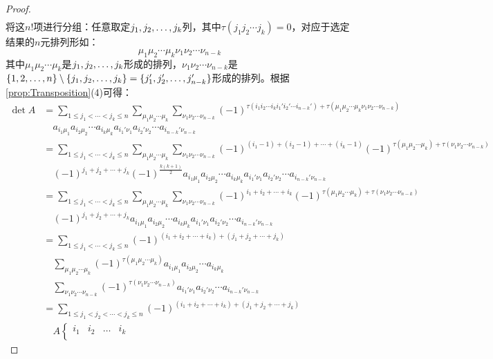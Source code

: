 \begin{proof}
\begin{align*}
	\end{align*}
	将这$n!$项进行分组：任意取定$j_1, j_2, \dots, j_{k}$列，其中$\tau(j_1j_2\cdots j_k)=0$，对应于选定结果的$n$元排列形如：
	\begin{equation*}
		\mu_1\mu_2\cdots\mu_k\nu_1\nu_2\cdots\nu_{n-k}
	\end{equation*}
	其中$\mu_1\mu_2\cdots\mu_k$是$j_1, j_2, \dots, j_{k}$形成的排列，$\nu_1\nu_2\cdots\nu_{n-k}$是$\{1,2,\dots,n\}\setminus\{j_1, j_2, \dots, j_{k}\}=\{j_1',j_2',\dots,j_{n-k}'\}$形成的排列。根据\cref{prop:Transposition}(4)可得：
	\begin{align*}
		\det A&=\sum_{1\leqslant j_1<\cdots<j_k\leqslant n}\sum_{\mu_1\mu_2\cdots\mu_k}\sum_{\nu_1\nu_2\cdots\nu_{n-k}}(-1)^{\tau(i_1i_2\cdots i_ki_1'i_2'\cdots i_{n-k}')+\tau(\mu_1\mu_2\cdots\mu_k\nu_1\nu_2\cdots\nu_{n-k})} \\
		&\quad a_{i_1\mu_1}a_{i_2\mu_2}\cdots a_{i_k\mu_k}a_{i_1'\nu_1}a_{i_2'\nu_2}\cdots a_{i_{n-k}'\nu_{n-k}} \\
		&=\sum_{1\leqslant j_1<\cdots<j_k\leqslant n}\sum_{\mu_1\mu_2\cdots\mu_k}\sum_{\nu_1\nu_2\cdots\nu_{n-k}}(-1)^{(i_1-1)+(i_2-1)+\cdots+(i_{k}-1)}(-1)^{\tau(\mu_1\mu_2\cdots\mu_k)+\tau(\nu_1\nu_2\cdots\nu_{n-k})} \\
		&\quad(-1)^{j_1+j_2+\cdots+j_k}(-1)^{\frac{k(k+1)}{2}}a_{i_1\mu_1}a_{i_2\mu_2}\cdots a_{i_k\mu_k}a_{i_1'\nu_1}a_{i_2'\nu_2}\cdots a_{i_{n-k}'\nu_{n-k}} \\
		&=\sum_{1\leqslant j_1<\cdots<j_k\leqslant n}\sum_{\mu_1\mu_2\cdots\mu_k}\sum_{\nu_1\nu_2\cdots\nu_{n-k}}(-1)^{i_1+i_2+\cdots+i_k}(-1)^{\tau(\mu_1\mu_2\cdots\mu_k)+\tau(\nu_1\nu_2\cdots\nu_{n-k})} \\
		&\quad(-1)^{j_1+j_2+\cdots+j_k}a_{i_1\mu_1}a_{i_2\mu_2}\cdots a_{i_k\mu_k}a_{i_1'\nu_1}a_{i_2'\nu_2}\cdots a_{i_{n-k}'\nu_{n-k}} \\
		&=\sum_{1\leqslant j_1<\cdots<j_k\leqslant n}(-1)^{(i_1+i_2+\cdots+i_k)+(j_1+j_2+\cdots+j_k)} \\
		&\quad\sum_{\mu_1\mu_2\cdots\mu_k}(-1)^{\tau(\mu_1\mu_2\cdots\mu_k)}a_{i_1\mu_1}a_{i_2\mu_2}\cdots a_{i_k\mu_k} \\
		&\quad\sum_{\nu_1\nu_2\cdots\nu_{n-k}}(-1)^{\tau(\nu_1\nu_2\cdots\nu_{n-k})}a_{i_1'\nu_1}a_{i_2'\nu_2}\cdots a_{i_{n-k}'\nu_{n-k}} \\
		&=\sum_{1\leqslant j_1<j_2<\cdots<j_k\leqslant n}(-1)^{(i_1+i_2+\cdots+i_k)+(j_1+j_2+\cdots+j_k)} \\
		&\quad A\left\{
		\begin{array}{*{4}{c}}
			i_1 & i_2 & \dots & i_k \\

\end{array}
\end{align*}
\end{proof}
